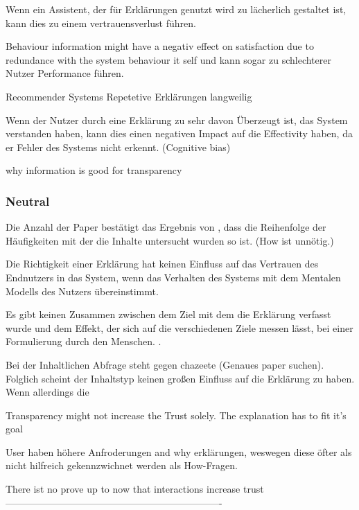 Wenn ein Assistent, der für Erklärungen genutzt wird zu lächerlich gestaltet ist, kann dies zu einem vertrauensverlust führen. \cite{wang_is_2018}

Behaviour information might have a negativ effect on satisfaction due to redundance with the system behaviour it self und kann sogar zu schlechterer Nutzer Performance führen. \cite{koo_why_2015}

Recommender Systems Repetetive Erklärungen \glqq langweilig\grqq{}

Wenn der Nutzer durch eine Erklärung zu sehr davon Überzeugt ist, das System verstanden haben, kann dies einen negativen Impact auf die Effectivity haben, da er Fehler des Systems nicht erkennt. (Cognitive bias) \cite{kohl_explainability_2019}

why information is good for transparency \cite{chazette2020explainability}

\subsubsection*{Neutral}

Die Anzahl der Paper bestätigt das Ergebnis von \cite{chazette_end-users_nodate}, dass die Reihenfolge der Häufigkeiten mit der die Inhalte untersucht wurden so ist. (How ist unnötig.)

Die Richtigkeit einer Erklärung hat keinen Einfluss auf das Vertrauen des Endnutzers in das System, wenn das Verhalten des Systems mit dem Mentalen Modells des Nutzers übereinstimmt. \cite{eiband_impact_2019, riveiro_thats_2021}

Es gibt keinen Zusammen zwischen dem Ziel mit dem die Erklärung verfasst wurde und dem Effekt, der sich auf die verschiedenen Ziele messen lässt, bei einer Formulierung durch den Menschen. \cite{balog_measuring_2020}.

Bei der Inhaltlichen Abfrage steht \cite{zahedi_towards_2019} gegen chazeete (Genaues paper suchen). Folglich scheint der Inhaltstyp keinen großen Einfluss auf die Erklärung zu haben. Wenn allerdings die 

Transparency might not increase the Trust solely. The explanation has to fit it's goal \cite{wiegand2019drive}

User haben höhere Anfroderungen and why erklärungen, weswegen diese öfter als nicht hilfreich gekennzwichnet werden als How-Fragen. \cite{lim_2009_assessing}

There ist no prove up to now that interactions increase trust \cite{cheng2019explaining}
-------------------------------------------------------------------

